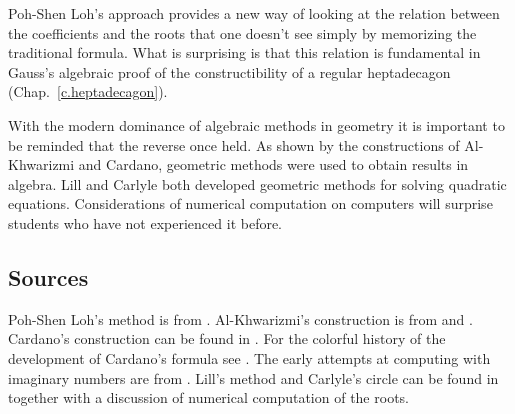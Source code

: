 Poh-Shen Loh's approach provides a new way of looking at the relation between the coefficients and the roots that one doesn't see simply by memorizing the traditional formula. What is surprising is that this relation is fundamental in Gauss's algebraic proof of the constructibility of a regular heptadecagon (Chap.~\ref{c.heptadecagon}).

With the modern dominance of algebraic methods in geometry it is important to be reminded that the reverse once held. As shown by the constructions of Al-Khwarizmi and Cardano, geometric methods were used to obtain results in algebra. Lill and Carlyle both developed geometric methods for solving quadratic equations. Considerations of numerical computation on computers will surprise students who have not experienced it before.

\subsection*{Sources}
Poh-Shen Loh's method is from \cite{loh1,loh2}. Al-Khwarizmi's construction is from \cite[Chapter~1]{jorg} and \cite{mastin}. Cardano's construction can be found in \cite[Chap.~1]{jorg}. For the colorful history of the development of Cardano's formula see \cite{wiki:cardano}. The early attempts at computing with imaginary numbers are from \cite[Chapter~2]{jorg}. Lill's method and Carlyle's circle can be found in \cite{wiki:quadratic} together with a discussion of numerical computation of the roots.
